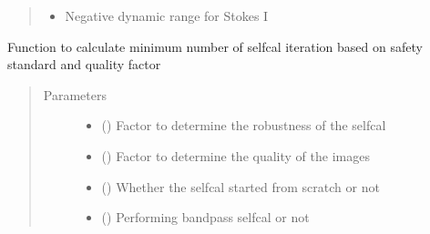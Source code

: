 \documentclass[letterpaper,10pt,english]{sphinxmanual}
\begin{document}
\begin{fulllineitems}
\begin{fulllineitems}
\begin{quote}
\begin{description}
\begin{itemize}
\item {} 
\sphinxAtStartPar
{} \textendash{} Negative dynamic range for Stokes I

\end{itemize}


\end{description}\end{quote}

\end{fulllineitems}


\begin{fulllineitems}
\label{\detokenize{paircars:paircars.intensity_selfcal_LTS.IntensitySelfcal.calc_iter_num}}
\sphinxAtStartPar
Function to calculate minimum number of selfcal iteration based on safety standard and quality factor
\begin{quote}\begin{description}
\item[{Parameters}] \leavevmode\begin{itemize}
\item {} 
\sphinxAtStartPar
{} () \textendash{} Factor to determine the robustness of the selfcal

\item {} 
\sphinxAtStartPar
{} () \textendash{} Factor to determine the quality of the images

\item {} 
\sphinxAtStartPar
{} () \textendash{} Whether the selfcal started from scratch or not

\item {} 
\sphinxAtStartPar
{} () \textendash{} Performing bandpass selfcal or not


\end{itemize}
\end{description}
\end{quote}
\end{fulllineitems}
\end{fulllineitems}
\end{document}

